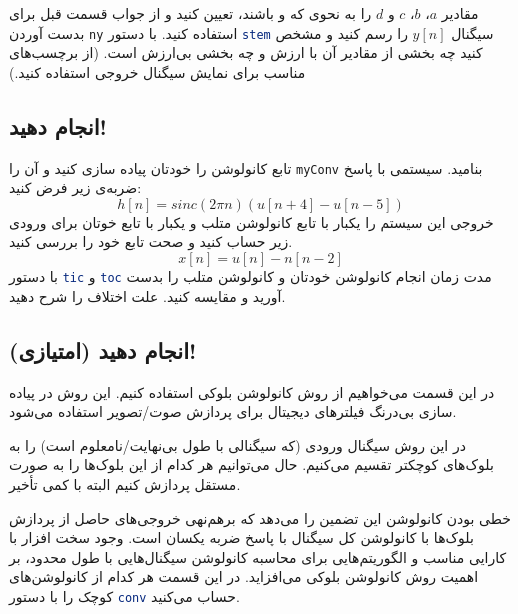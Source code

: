 \documentclass{utsignal}
\begin{document}
		مقادیر $a$، $b$، $c$ و $d$ را به نحوی که  و  باشند، تعیین کنید و از جواب قسمت قبل برای بدست آوردن \lstinline[language=Octave]{ny} استفاده کنید. با دستور \lstinline[language=Octave]{stem} سیگنال $y[n]$ را رسم کنید و مشخص کنید چه بخشی از مقادیر آن با ارزش و چه بخشی بی‌ارزش است. (از برچسب‌های مناسب برای نمایش سیگنال خروجی استفاده کنید.)
	\subsection{انجام دهید!}
	تابع کانولوشن را خودتان پیاده سازی کنید و آن را \lstinline[language=Octave]{myConv} بنامید.
	سیستمی با پاسخ ضربه‌ی زیر فرض کنید:
	$$
	h[n] = sinc(2\pi n) (u[n + 4] - u[n - 5])
	$$
	خروجی این سیستم را یکبار با تابع کانولوشن متلب و یکبار با تابع خوتان برای ورودی زیر حساب کنید و صحت تابع خود را بررسی کنید.
	$$
	x[n]=u[n]-n[n-2]
	$$
	با دستور \lstinline[language=Octave]{tic} و \lstinline[language=Octave]{toc} مدت زمان انجام کانولوشن خودتان و کانولوشن متلب را بدست آورید و مقایسه کنید. علت اختلاف را شرح دهید.
	\subsection{انجام دهید (امتیازی)!}
	در این قسمت می‌خواهیم از روش کانولوشن بلوکی استفاده کنیم. این روش در پیاده سازی بی‌درنگ فیلترهای دیجیتال برای پردازش صوت/تصویر استفاده می‌شود.

	در این روش سیگنال ورودی (که سیگنالی با طول بی‌نهایت/نامعلوم است) را به بلوک‌های کوچکتر تقسیم می‌کنیم. حال می‌توانیم هر کدام از این بلوک‌ها را به صورت مستقل پردازش کنیم البته با کمی تأخیر. 
	
	خطی بودن کانولوشن این تضمین را می‌دهد که برهم‌نهی  خروجی‌های حاصل از پردازش بلوک‌ها با کانولوشن کل سیگنال با پاسخ ضربه یکسان است. وجود سخت افزار با کارایی مناسب و الگوریتم‌‌هایی برای محاسبه کانولوشن سیگنال‌هایی با طول محدود، بر اهمیت روش کانولوشن بلوکی ‌می‌افزاید. در این قسمت هر کدام از کانولوشن‌های کوچک را با دستور \lstinline[language=Octave]{conv} حساب می‌کنید.
	
\end{document}
